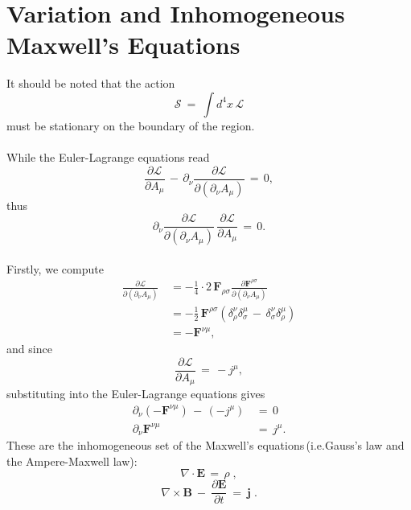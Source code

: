 \documentclass[11pt]{article}
\numberwithin{equation}{section}
\begin{document}
\section{Variation and Inhomogeneous Maxwell's Equations}
It should be noted that the action
\begin{equation}
   \mathcal S\:=\:\int\! d^4x\, \mathcal{L}
\end{equation}
must be stationary on the boundary of the region.\\
\\[0.5em]
While the Euler-Lagrange equations read 
\begin{equation}
   \frac{\partial\mathcal{L}}{\partial A_\mu}\,-\,\partial_\nu\frac{\partial\mathcal{L}}{\partial(\partial_\nu A_\mu)}\,=\,0,
\end{equation}
thus
\begin{equation}
   \partial_\nu\frac{\partial\mathcal{L}}{\partial(\partial_\nu A_\mu)}\,\frac{\partial\mathcal{L}}{\partial A_\mu}\,=\,0.
\end{equation}
\\[0.5em]
Firstly, we compute
\begin{equation}
\begin{split}
\frac{\partial\mathcal{L}}{\partial(\partial_\nu A_\mu)}\, &= -\frac{1}{4}\cdot2\,
\mathbf F_{\rho\sigma}\frac{\partial \mathbf F^{\rho\sigma}}{\partial(\partial_\nu A_\mu)}\\ &=-\frac{1}{2}\,\mathbf F^{\rho\sigma}(\delta^\nu_\rho\delta^\mu_\sigma\,-\,\delta^\nu_\sigma\delta^\mu_\rho)\\
&=-\mathbf F^{\nu\mu},
\end{split}
\end{equation}
and since
\begin{equation}
\frac{\partial\mathcal{L}}{\partial A_\mu}\,=\,-j^\mu,
\end{equation}
substituting into the Euler-Lagrange equations gives
\begin{equation}
\begin{split}
\partial_\nu(-\mathbf F^{\nu\mu})\,-\,(-j^\mu)\,&=\,0\\
\partial_\nu\mathbf F^{\nu\mu}\,&=\,j^\mu.
\end{split}
\end{equation}
These are the inhomogeneous set of the Maxwell's equations\,(i.e.Gauss's law and the Ampere-Maxwell law):
\begin{equation}
    \nabla\cdot\mathbf E\,=\,\rho\;,
\end{equation}
\begin{equation}
    \nabla\times\mathbf B\:-\:\frac{\partial\mathbf E}{\partial t}\:=\:\mathbf j\;.
\end{equation}
\newpage
\end{document}
